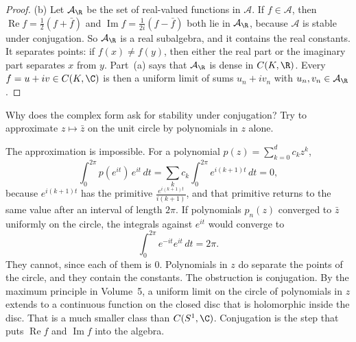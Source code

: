 \begin{proof}
(b) Let $\mathcal A_\R$ be the set of real-valued functions in $\mathcal A$. If $f\in\mathcal A$, then $\operatorname{Re}f=\frac12(f+\bar f)$ and $\operatorname{Im}f=\frac1{2i}(f-\bar f)$ both lie in $\mathcal A_\R$, because $\mathcal A$ is stable under conjugation. So $\mathcal A_\R$ is a real subalgebra, and it contains the real constants. It separates points: if $f(x)\ne f(y)$, then either the real part or the imaginary part separates $x$ from $y$. Part~(a) says that $\mathcal A_\R$ is dense in $C(K,\R)$. Every $f=u+iv\in C(K,\C)$ is then a uniform limit of sums $u_n+iv_n$ with $u_n,v_n\in\mathcal A_\R$.
\end{proof}

\begin{think}
Why does the complex form ask for stability under conjugation? Try to approximate $z\mapsto\bar z$ on the unit circle by polynomials in $z$ alone.
\end{think}

The approximation is impossible. For a polynomial $p(z)=\sum_{k=0}^d c_k z^k$,
\[\int_0^{2\pi}p(e^{it})\,e^{it}\,dt=\sum_kc_k\int_0^{2\pi}e^{i(k+1)t}\,dt=0,\]
because $e^{i(k+1)t}$ has the primitive $\frac{e^{i(k+1)t}}{i(k+1)}$, and that primitive returns to the same value after an interval of length $2\pi$. If polynomials $p_n(z)$ converged to $\bar z$ uniformly on the circle, the integrals against $e^{it}$ would converge to
\[\int_0^{2\pi}e^{-it}e^{it}\,dt=2\pi.\]
They cannot, since each of them is $0$. Polynomials in $z$ do separate the points of the circle, and they contain the constants. The obstruction is conjugation. By the maximum principle in Volume~5, a uniform limit on the circle of polynomials in $z$ extends to a continuous function on the closed disc that is holomorphic inside the disc. That is a much smaller class than $C(S^1,\C)$. Conjugation is the step that puts $\operatorname{Re}f$ and $\operatorname{Im}f$ into the algebra.


